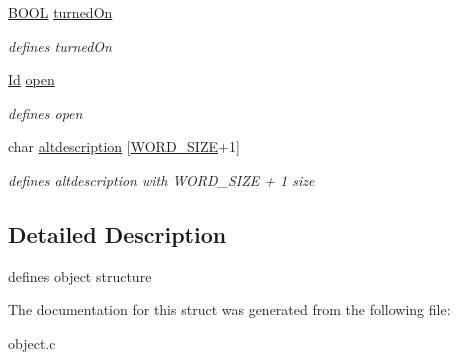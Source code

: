 \begin{DoxyCompactItemize}
\hyperlink{types_8h_a3e5b8192e7d9ffaf3542f1210aec18dd}{B\+O\+OL} \hyperlink{struct__Object_aa447a4dd98c8c66f485ede35d02ea3a9}{turned\+On}
\begin{DoxyCompactList}\small\item\em defines turned\+On \end{DoxyCompactList}\item 
\mbox{\label{struct__Object_a0922dd9891e6aa617ce1d51ae27c0175}} 
\hyperlink{types_8h_a845e604fb28f7e3d97549da3448149d3}{Id} \hyperlink{struct__Object_a0922dd9891e6aa617ce1d51ae27c0175}{open}
\begin{DoxyCompactList}\small\item\em defines open \end{DoxyCompactList}\item 
\mbox{\label{struct__Object_a3dd30d3c4c3a88e9f12121c9ae12530c}} 
char \hyperlink{struct__Object_a3dd30d3c4c3a88e9f12121c9ae12530c}{altdescription} \mbox{[}\hyperlink{types_8h_a92ed8507d1cd2331ad09275c5c4c1c89}{W\+O\+R\+D\+\_\+\+S\+I\+ZE}+1\mbox{]}
\begin{DoxyCompactList}\small\item\em defines altdescription with W\+O\+R\+D\+\_\+\+S\+I\+ZE + 1 size \end{DoxyCompactList}\end{DoxyCompactItemize}


\subsection{Detailed Description}
defines object structure 

The documentation for this struct was generated from the following file\+:\begin{DoxyCompactItemize}
\item 
object.\+c\end{DoxyCompactItemize}
